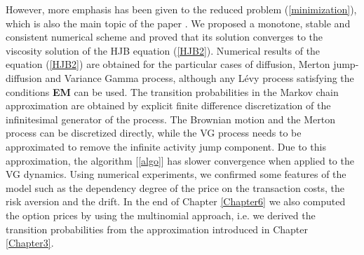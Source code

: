 However, more emphasis has been given to the reduced problem (\ref{minimization}), which is also the main topic of the paper \cite{Canta}.
We proposed a monotone, stable and consistent numerical scheme and proved that its solution converges to the viscosity solution of the
HJB equation (\ref{HJB2}).
Numerical results of the equation (\ref{HJB2}) are obtained for the particular cases of diffusion, Merton jump-diffusion and Variance Gamma process, 
although any Lévy process satisfying the conditions \textbf{EM} can be used. 
The transition probabilities in the Markov chain approximation are obtained by explicit finite difference discretization of the 
infinitesimal generator of the process. 
The Brownian motion and the Merton process can be discretized directly, 
while the VG process needs to be approximated to remove the infinite activity jump component.
Due to this approximation, the algorithm [\ref{algo}] has slower convergence when applied to the VG dynamics.
Using numerical experiments, we confirmed some features of the model such as the dependency degree of the price on the transaction costs, the risk aversion and the drift. 
In the end of Chapter \ref{Chapter6} we also computed the option prices by using the multinomial approach, i.e. we derived the transition probabilities 
from the approximation introduced in Chapter \ref{Chapter3}. 
